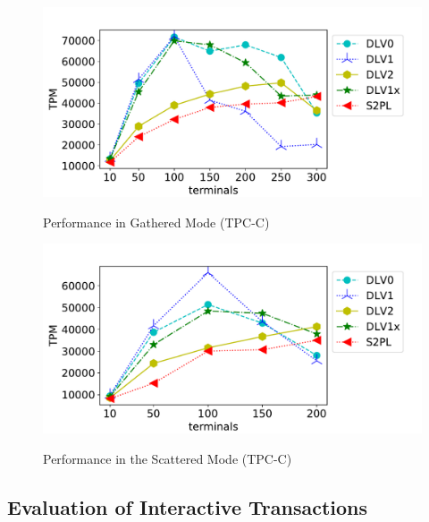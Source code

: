 \documentclass[conference]{IEEEtran}
\begin{document}
\begin{figure}[tbp]
  \centering

      { \includegraphics[scale=0.35] {figure/plot_tpcc_neworder_add_Terminal_Terminal_TPM_gather} \label{fig:new_order_add_terminal_gathered:tpm}
      
      }

\caption{Performance in Gathered Mode (TPC-C) }
\label{fig:new_order_add_terminal_gathered}
\end{figure}

\begin{figure}[tbp]
  \centering

      { \includegraphics[scale=0.35] {figure/plot_tpcc_neworder_add_Terminal_Terminal_TPM_scatter} \label{fig:new_order_add_terminal_scattered:tpm}}


\caption{Performance in the Scattered Mode (TPC-C) }
\label{fig:new_order_add_terminal_scattered}
\end{figure}

\subsection{Evaluation of Interactive Transactions}
\end{document}
